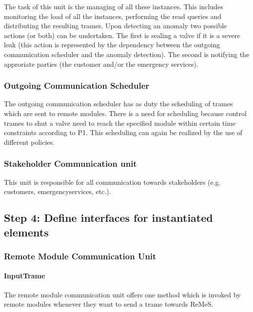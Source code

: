 \npar The task of this unit is the managing of all these instances. This
includes monitoring the load of all the instances, performing the read queries
and distributing the resulting trames. Upon detecting an anomaly two possible
actions (or both) can be undertaken. The first is sealing a valve if it is a
severe leak (this action is represented by the dependency between the outgoing
communication scheduler and the anomaly detection). The second is notifying the
approriate parties (the customer and/or the emergency services).

\subsubsection{Outgoing Communication Scheduler}

\npar The outgoing communication scheduler has as duty the scheduling of
trames which are sent to remote modules. There is a need for scheduling because
control trames to shut a valve need to reach the specified module within certain
time constraints according to P1. This scheduling can again be realized by the
use of different policies.

\subsubsection{Stakeholder Communication unit}

\npar This unit is responsible for all communication towards stakeholders (e.g.
customers, emergencyservices, etc.). 

\subsection{Step 4: Define interfaces for instantiated elements}
\label{add:it1/interfaces}

\subsubsection{Remote Module Communication Unit}

\paragraph{InputTrame} %

\npar The remote module communication unit offers one method
 which is invoked by remote modules whenever they want
to send a trame towards ReMeS.

